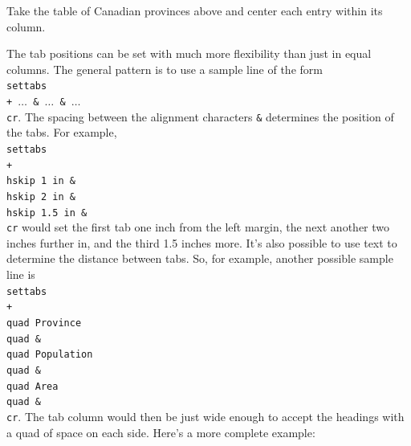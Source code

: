 \exercise Take the table of Canadian provinces above and center{} each 
entry within its column. 

The tab positions can be set with much more flexibility than just 
in equal columns.  The general pattern is to use a sample line of 
the form {\tt \\settabs \\+ $\ldots$ \& $\ldots$ \& $\ldots$ \\cr}. 
The spacing between the alignment characters {\tt \&} 
determines the position of the tabs.  For example, {\tt \\settabs 
\\+ \\hskip 1 in \& \\hskip 2 in \& \\hskip 1.5 in \& \\cr} would 
set the first tab one inch from the left margin, the next another 
two inches further in, and the third 1.5 inches more.  It's also 
possible to use text to determine the distance between tabs. So, 
for example, another possible sample line is 
{\tt \\settabs \\+ \\quad Province \\quad \& \\quad Population \\quad 
\& \\quad Area \\quad \& \\cr}. 
The tab column would then be just wide enough to accept the headings 
with a quad of space on each side.  Here's a more complete example: 

